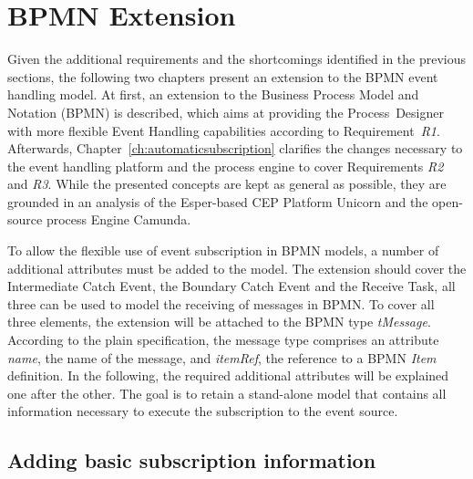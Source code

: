 \section{BPMN Extension}


Given the additional requirements and the shortcomings identified in the previous sections, the following two chapters present an extension to the BPMN event handling model.
At first, an extension to the Business Process Model and Notation (BPMN) is described, which aims at providing the Process~Designer with more flexible Event Handling capabilities according to Requirement~\textit{R1}.
Afterwards, Chapter~\autoref{ch:automaticsubscription} clarifies the changes necessary to the event handling platform and the process engine to cover Requirements \textit{R2} and \textit{R3}.
While the presented concepts are kept as general as possible, they are grounded in an analysis of the Esper-based CEP Platform Unicorn and the open-source process Engine Camunda.

To allow the flexible use of event subscription in BPMN models, a number of additional attributes must be added to the model. 
The extension should cover the Intermediate Catch Event, the Boundary Catch Event and the Receive Task, all three can be used to model the receiving of messages in BPMN.
To cover all three elements, the extension will be attached to the BPMN type \textit{tMessage}. 
According to the plain specification, the message type comprises an attribute \textit{name}, the name of the message, and \textit{itemRef}, the reference to a BPMN \textit{Item} definition. 
In the following, the required additional attributes will be explained one after the other. The goal is to retain a stand-alone model that contains all information necessary to execute the subscription to the event source.

\subsection{Adding basic subscription information}\label{ch:bpmnx:basic}

